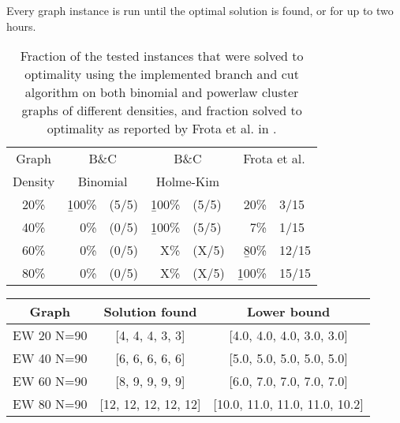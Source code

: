 Every graph instance is run until the optimal solution is found, or for up to two hours.

\begin{table}[h]
\centering
\begin{tabular}{|c|rl|rl|rl|}
\hline
Graph & \multicolumn{2}{|c|}{B\&C} & \multicolumn{2}{|c|}{B\&C} & \multicolumn{2}{|c|}{Frota et al.} \\
Density & \multicolumn{2}{|c|}{Binomial} & \multicolumn{2}{|c|}{Holme-Kim} & \multicolumn{2}{|c|}{} \\
\hline
20\% & \b{100\%} & (5/5) & \b{100\%} & (5/5) & 20\% & 3/15 \\
40\% & 0\% & (0/5) & \b{100\%} & (5/5) & 7\% & 1/15 \\
60\% & 0\% & (0/5) & X\% & (X/5) & \b{80\%} & 12/15 \\
80\% & 0\% & (0/5) & X\% & (X/5) & \b{100\%} & 15/15 \\
\hline 
\end{tabular} 
\caption{Fraction of the tested instances that were solved to optimality using the implemented branch and cut algorithm on both binomial and powerlaw cluster graphs of different densities, and fraction solved to optimality as reported by Frota et al. in \cite{frota2010branch}.}
\label{table:final:frotaetal}
\end{table}


\begin{tabular}{|c|cc|}
\hline
Graph & Solution found & Lower bound
\\
\hline
EW 20 N=90 & [4, 4, 4, 3, 3] & [4.0, 4.0, 4.0, 3.0, 3.0]
\\
EW 40 N=90 & [6, 6, 6, 6, 6] & [5.0, 5.0, 5.0, 5.0, 5.0]
\\
EW 60 N=90 & [8, 9, 9, 9, 9] & [6.0, 7.0, 7.0, 7.0, 7.0]
\\
EW 80 N=90 & [12, 12, 12, 12, 12] & [10.0, 11.0, 11.0, 11.0, 10.2]
\\
\hline
\end{tabular}
